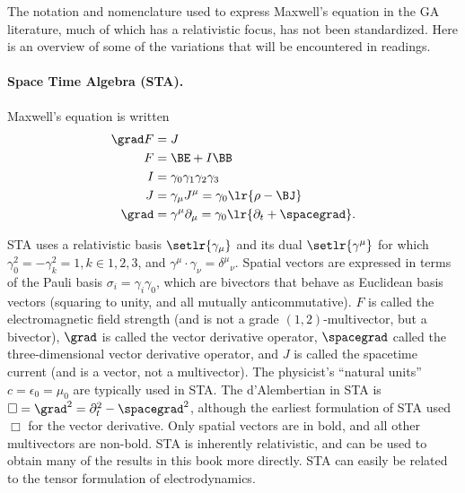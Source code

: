 %
%
The notation and nomenclature used to express Maxwell's equation in the GA literature, much of which has a relativistic focus, has not been standardized.
Here is an overview of some of the variations that will be encountered in readings.

\paragraph{Space Time Algebra (STA).  \citep{doran2003gap}}

Maxwell's equation is written
\begin{equation}\label{eqn:galiterature:80}
\begin{aligned}
\grad F &= J \\
F &= \BE + I \BB \\
I &= \gamma_0 \gamma_1 \gamma_2 \gamma_3 \\
J &= \gamma_\mu J^\mu = \gamma_0 \lr{ \rho - \BJ } \\
\grad &= \gamma^\mu \partial_\mu = \gamma_0 \lr{ \partial_t + \spacegrad }.
\end{aligned}
\end{equation}

STA uses a relativistic basis \( \setlr{ \gamma_\mu } \) and its dual \( \setlr{ \gamma^\mu} \) for which \( \gamma_0^2 = -\gamma_k^2 = 1, k \in 1,2,3 \), and \( \gamma^\mu \cdot \gamma_\nu = {\delta^\mu}_\nu \).
Spatial vectors are expressed in terms of the Pauli basis \( \sigma_i = \gamma_i \gamma_0 \), which are bivectors that behave as Euclidean basis vectors (squaring to unity, and all mutually anticommutative).
\( F \) is called the electromagnetic field strength (and is not a grade \((1,2)\)-multivector, but a bivector), \( \grad \) is called the vector derivative operator, \( \spacegrad \) called the three-dimensional vector derivative operator, and \( J \) is called the spacetime current (and is a vector, not a multivector).
The physicist's ``natural units'' \( c = \epsilon_0 = \mu_0 \) are typically used in STA.
The d'Alembertian in STA is \( \Box = \grad^2 = \partial_t^2 - \spacegrad^2 \), although the earliest
formulation of STA \citep{hestenes1966space} used \( \Box \) for the vector derivative.
Only spatial vectors are in bold, and all other multivectors are non-bold.
STA is inherently relativistic, and can be used to obtain many of the results in this book more directly.
STA can easily be related to the tensor formulation of electrodynamics.

